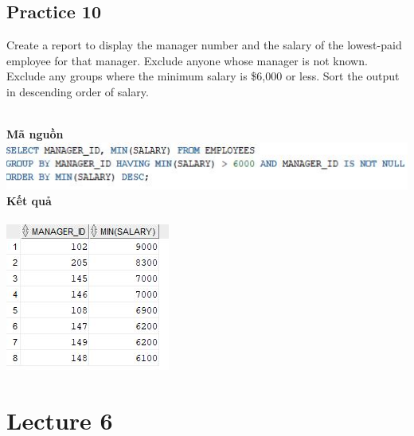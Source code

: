 \documentclass[12pt,a4paper]{report}
\begin{document}
\subsection{Practice 10}
\begin{boxedminipage}[t]{15.5cm}
Create a report to display the manager number and the salary of the lowest-paid employee for that manager. 
Exclude anyone whose manager is not known. Exclude any groups where the minimum salary is \$6,000 or less. 
Sort the output in descending order of salary.
\end{boxedminipage}
\newline
\\
\textbf{Mã nguồn}
\\
\newline
\includegraphics[scale=1]{105.jpg}\\
\textbf{Kết quả}\\\\
\includegraphics[scale=1]{k105.jpg}

\section{Lecture 6}
\end{document}

